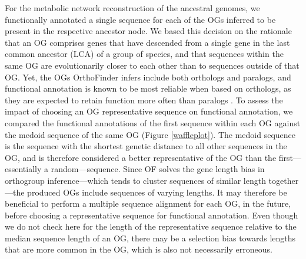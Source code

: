 For the metabolic network reconstruction of the ancestral genomes, we functionally annotated a single sequence for each of the OGs inferred to be present in the respective ancestor node. We based this decision on the rationale that an OG comprises genes that have descended from a single gene in the last common ancestor (LCA) of a group of species, and that sequences within the same OG are evolutionarily closer to each other than to sequences outside of that OG. Yet, the OGs OrthoFinder infers include both orthologs and paralogs, and functional annotation is known to be most reliable when based on orthologs, as they are expected to retain function more often than paralogs \cite{gabaldon2013a}. To assess the impact of choosing an OG representative sequence on functional annotation, we compared the functional annotations of the first sequence within each OG against the medoid sequence of the same OG (Figure \ref{waffleplot}). The medoid sequence is the sequence with the shortest genetic distance to all other sequences in the OG, and is therefore considered a better representative of the OG than the first---essentially a random---sequence. Since OF solves the gene length bias in orthogroup inference---which tends to cluster sequences of similar length together---the produced OGs include sequences of varying lengths. It may therefore be beneficial to perform a multiple sequence alignment for each OG, in the future, before choosing a representative sequence for functional annotation. Even though we do not check here for the length of the representative sequence relative to the median sequence length of an OG, there may be a selection bias towards lengths that are more common in the OG, which is also not necessarily erroneous. 

